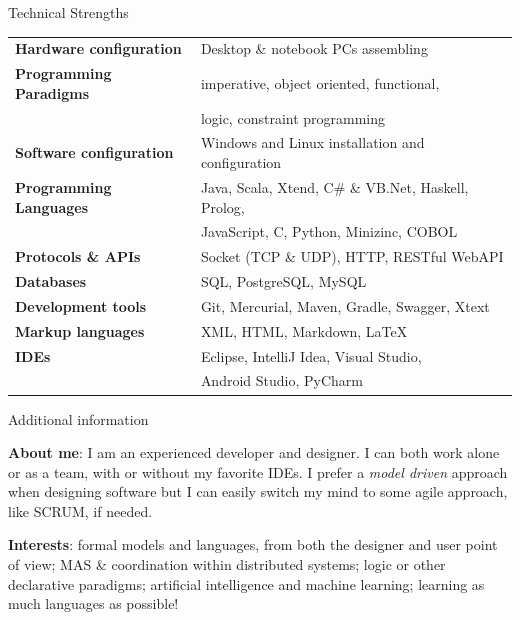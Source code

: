 \documentclass{resume} %
\begin{document}
\begin{rSection}{Technical Strengths}
\begin{tabular}{ @{} >{\bfseries}l @{\hspace{6ex}} l }
Hardware configuration 	& Desktop \& notebook PCs assembling \\
Programming Paradigms	& imperative, object oriented, functional,\\
						& logic, constraint programming\\
Software configuration 	& Windows and Linux installation and configuration\\
Programming Languages 	& Java, Scala, Xtend, C\# \& VB.Net, Haskell, Prolog,\\
						& JavaScript, C, Python, Minizinc, COBOL\\
Protocols \& APIs 		& Socket (TCP \& UDP), HTTP, RESTful WebAPI \\
Databases 				& SQL, PostgreSQL, MySQL\\
Development tools 		& Git, Mercurial, Maven, Gradle, Swagger, Xtext\\
Markup languages 		& XML, HTML, Markdown, \LaTeX \\
IDEs 					& Eclipse, IntelliJ Idea, Visual Studio, \\
						& Android Studio, PyCharm
\end{tabular}						
\end{rSection}



\begin{rSection}{Additional information}

\item \textbf{About me}: I am an experienced developer and designer. 
I can both work alone or as a team, with or without my favorite IDEs. 
I prefer a \emph{model driven} approach when designing software but I can easily switch my mind to some agile approach, like SCRUM, if needed.

\item \textbf{Interests}: formal models and languages, from both the designer and user point of view; MAS \& coordination within distributed systems; logic or other declarative paradigms; artificial intelligence and machine learning; learning as much languages as possible!
\end{rSection}
\end{document}
